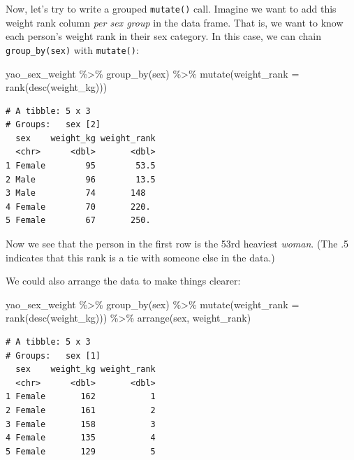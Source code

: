 \documentclass[
  letterpaper,
  DIV=11,
  numbers=noendperiod]{scrreprt}
\newenvironment{Shaded}{\begin{snugshade}}{\end{snugshade}}
\newcommand{\AttributeTok}[1]{\textcolor[rgb]{0.40,0.45,0.13}{#1}}
\newcommand{\FunctionTok}[1]{\textcolor[rgb]{0.28,0.35,0.67}{#1}}
\newcommand{\NormalTok}[1]{\textcolor[rgb]{0.00,0.23,0.31}{#1}}
\newcommand{\SpecialCharTok}[1]{\textcolor[rgb]{0.37,0.37,0.37}{#1}}
\begin{document}
Now, let's try to write a grouped \texttt{mutate()} call. Imagine we
want to add this weight rank column \emph{per sex group} in the data
frame. That is, we want to know each person's weight rank in their sex
category. In this case, we can chain \texttt{group\_by(sex)} with
\texttt{mutate()}:

\begin{Shaded}
\begin{Highlighting}[]
\NormalTok{yao\_sex\_weight }\SpecialCharTok{\%\textgreater{}\%} 
  \FunctionTok{group\_by}\NormalTok{(sex) }\SpecialCharTok{\%\textgreater{}\%} 
  \FunctionTok{mutate}\NormalTok{(}\AttributeTok{weight\_rank =} \FunctionTok{rank}\NormalTok{(}\FunctionTok{desc}\NormalTok{(weight\_kg)))}
\end{Highlighting}
\end{Shaded}

\begin{verbatim}
# A tibble: 5 x 3
# Groups:   sex [2]
  sex    weight_kg weight_rank
  <chr>      <dbl>       <dbl>
1 Female        95        53.5
2 Male          96        13.5
3 Male          74       148  
4 Female        70       220. 
5 Female        67       250. 
\end{verbatim}

Now we see that the person in the first row is the 53rd heaviest
\emph{woman}. (The .5 indicates that this rank is a tie with someone
else in the data.)

We could also arrange the data to make things clearer:

\begin{Shaded}
\begin{Highlighting}[]
\NormalTok{yao\_sex\_weight }\SpecialCharTok{\%\textgreater{}\%} 
  \FunctionTok{group\_by}\NormalTok{(sex) }\SpecialCharTok{\%\textgreater{}\%} 
  \FunctionTok{mutate}\NormalTok{(}\AttributeTok{weight\_rank =} \FunctionTok{rank}\NormalTok{(}\FunctionTok{desc}\NormalTok{(weight\_kg))) }\SpecialCharTok{\%\textgreater{}\%} 
  \FunctionTok{arrange}\NormalTok{(sex, weight\_rank)}
\end{Highlighting}
\end{Shaded}

\begin{verbatim}
# A tibble: 5 x 3
# Groups:   sex [1]
  sex    weight_kg weight_rank
  <chr>      <dbl>       <dbl>
1 Female       162           1
2 Female       161           2
3 Female       158           3
4 Female       135           4
5 Female       129           5
\end{verbatim}
\end{document}
